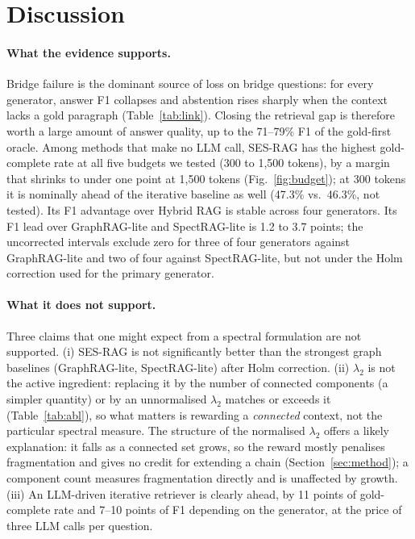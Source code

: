 \section{Discussion}
\label{sec:discussion}

\paragraph{What the evidence supports.}
Bridge failure is the dominant source of loss on bridge questions: for every generator, answer F1 collapses and abstention rises sharply when the context lacks a gold paragraph (Table~\ref{tab:link}). Closing the retrieval gap is therefore worth a large amount of answer quality, up to the 71--79\% F1 of the gold-first oracle. Among methods that make no LLM call, SES-RAG has the highest gold-complete rate at all five budgets we tested (300 to 1{,}500 tokens), by a margin that shrinks to under one point at 1{,}500 tokens (Fig.~\ref{fig:budget}); at 300 tokens it is nominally ahead of the iterative baseline as well (47.3\% vs.\ 46.3\%, not tested). Its F1 advantage over Hybrid RAG is stable across four generators. Its F1 lead over GraphRAG-lite and SpectRAG-lite is 1.2 to 3.7 points; the uncorrected intervals exclude zero for three of four generators against GraphRAG-lite and two of four against SpectRAG-lite, but not under the Holm correction used for the primary generator.

\paragraph{What it does not support.}
Three claims that one might expect from a spectral formulation are not supported. (i) SES-RAG is not significantly better than the strongest graph baselines (GraphRAG-lite, SpectRAG-lite) after Holm correction. (ii) $\lambda_2$ is not the active ingredient: replacing it by the number of connected components (a simpler quantity) or by an unnormalised $\lambda_2$ matches or exceeds it (Table~\ref{tab:abl}), so what matters is rewarding a \emph{connected} context, not the particular spectral measure. The structure of the normalised $\lambda_2$ offers a likely explanation: it falls as a connected set grows, so the reward mostly penalises fragmentation and gives no credit for extending a chain (Section~\ref{sec:method}); a component count measures fragmentation directly and is unaffected by growth. (iii) An LLM-driven iterative retriever is clearly ahead, by 11 points of gold-complete rate and 7--10 points of F1 depending on the generator, at the price of three LLM calls per question.


